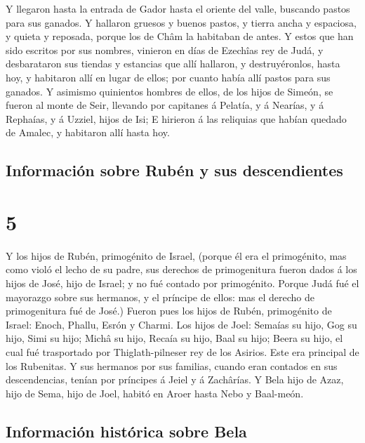  Y llegaron hasta la entrada de Gador hasta el oriente del
valle, buscando pastos para sus ganados.  Y hallaron
gruesos y buenos pastos, y tierra ancha y espaciosa, y quieta y
reposada, porque los de Châm la habitaban de antes.  Y
estos que han sido escritos por sus nombres, vinieron en días de
Ezechîas rey de Judá, y desbarataron sus tiendas y estancias que allí
hallaron, y destruyéronlos, hasta hoy, y habitaron allí en lugar de
ellos; por cuanto había allí pastos para sus ganados.  Y
asimismo quinientos hombres de ellos, de los hijos de Simeón, se fueron
al monte de Seir, llevando por capitanes á Pelatía, y á Nearías, y á
Rephaías, y á Uzziel, hijos de Isi;  E hirieron á las
reliquias que habían quedado de Amalec, y habitaron allí hasta hoy.

\hypertarget{informaciuxf3n-sobre-rubuxe9n-y-sus-descendientes}{%
\subsection{Información sobre Rubén y sus
descendientes}\label{informaciuxf3n-sobre-rubuxe9n-y-sus-descendientes}}

\hypertarget{section-4}{%
\section{5}\label{section-4}}

 Y los hijos de Rubén, primogénito de Israel, (porque él era
el primogénito, mas como violó el lecho de su padre, sus derechos de
primogenitura fueron dados á los hijos de José, hijo de Israel; y no fué
contado por primogénito.  Porque Judá fué el mayorazgo sobre
sus hermanos, y el príncipe de ellos: mas el derecho de primogenitura
fué de José.)  Fueron pues los hijos de Rubén, primogénito
de Israel: Enoch, Phallu, Esrón y Charmi.  Los hijos de
Joel: Semaías su hijo, Gog su hijo, Simi su hijo;  Michâ su
hijo, Recaía su hijo, Baal su hijo;  Beera su hijo, el cual
fué trasportado por Thiglath-pilneser rey de los Asirios. Este era
principal de los Rubenitas.  Y sus hermanos por sus
familias, cuando eran contados en sus descendencias, tenían por
príncipes á Jeiel y á Zachârías.  Y Bela hijo de Azaz, hijo
de Sema, hijo de Joel, habitó en Aroer hasta Nebo y Baal-meón.

\hypertarget{informaciuxf3n-histuxf3rica-sobre-bela}{%
\subsection{Información histórica sobre
Bela}\label{informaciuxf3n-histuxf3rica-sobre-bela}}


